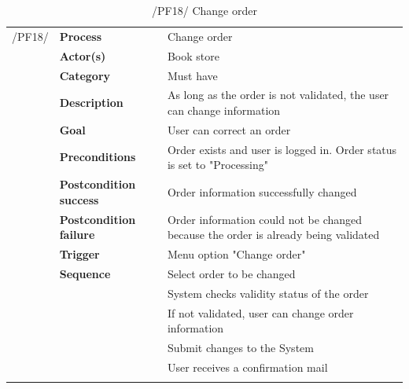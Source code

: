 \documentclass[11pt,a4paper,oneside,svgnames]{report}
\begin{document}
\begin{table}[H]
\centering
\begin{tabular}{p{1.5cm}p{3cm}p{8cm}}
\cellcolor{white}/PF18/	& \textbf{Process} & Change order\\
\cellcolor{white}		& \textbf{Actor(s)} & Book store\\
\cellcolor{white}		& \textbf{Category} & Must have\\
\cellcolor{white}		& \textbf{Description}	 & As long as the order is not validated, the user can change information\\
\cellcolor{white}		& \textbf{Goal} & User can correct an order\\
\cellcolor{white}		& \textbf{Preconditions} & Order exists and user is logged in. Order status is set to "Processing"\\
\cellcolor{white}		& \textbf{Postcondition success} & Order information successfully changed\\
\cellcolor{white}		& \textbf{Postcondition failure} & Order information could not be changed because the order is already being validated\\
\cellcolor{white}		& \textbf{Trigger} & Menu option "Change order"\\
\cellcolor{white}		& \textbf{Sequence} & Select order to be changed\\
\cellcolor{white}		& & System checks validity status of the order\\
\cellcolor{white}		& & If not validated, user can change order information\\
\cellcolor{white}		& & Submit changes to the System\\
\cellcolor{white}		& & User receives a confirmation mail\\
\cellcolor{white}\hfill \\
\end{tabular}
\caption{/PF18/ Change order}
\label{tab:pf18}
\end{table}
\end{document}
